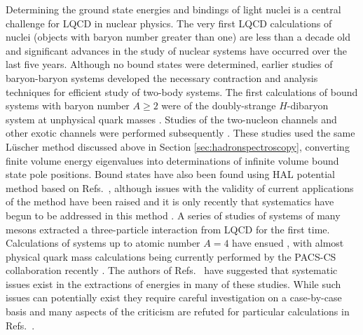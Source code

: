 Determining the ground state energies and bindings of light nuclei is a central challenge for LQCD in nuclear physics. The very first LQCD calculations of nuclei (objects with baryon number greater than one) are less than a decade old and significant advances in the study of nuclear systems have occurred over the last five years. Although no bound states were determined, earlier studies of baryon-baryon systems \cite{Yamazaki:2009ua,Beane:2006gf,Beane:2006mx,Beane:2009gs,Beane:2009kya}  developed the necessary contraction and analysis techniques for efficient study of two-body systems. 
The first calculations of bound systems with baryon number $A\ge2$ were of the doubly-strange $H$-dibaryon system at unphysical quark masses \cite{Beane:2010hg,Inoue:2010es,Beane:2011xf}. 
Studies of the two-nucleon channels \cite{Beane:2011iw} and other exotic channels were performed subsequently \cite{Berkowitz:2015eaa,Francis:2018qch,Wagman:2017tmp,MORE}. These studies used the same L\"uscher method discussed above in Section \ref{sec:hadronspectroscopy}, converting finite volume energy eigenvalues into determinations of infinite volume bound state pole positions. Bound states have also been found using HAL potential method \cite{Ishii:2006ec} based on Refs.~\cite{Luscher:1986pf,Lin:2001ek}, although issues with the validity of current applications of the method have been raised  \cite{Detmold:2007wk,Birse:2012ph,Yamazakiteal} and it is only recently that systematics have begun to be addressed in this method \cite{Kawai:2017goq}.
A series of studies of systems of many mesons \cite{Beane:2007es,Detmold:2008yn,Detmold:2011kw} extracted a three-particle interaction from LQCD for the first time.
Calculations of systems up to atomic number $A=4$  have ensued \cite{Beane:2012vq,Yamazaki:2012hi,Yamazaki:2015asa}, with almost physical quark mass calculations being currently performed by the PACS-CS collaboration recently \cite{Yamazaki:2015asa}. The authors of Refs.~\cite{Iritani:2018zbt} have suggested that systematic issues exist in the extractions of energies in many of these studies. While such issues can potentially exist they require careful investigation on a case-by-case basis and many aspects of the criticism are refuted for particular calculations in Refs.~\cite{Beane:2017edf,Namekawa:2017sxs,Yamazaki:2018qut}.

